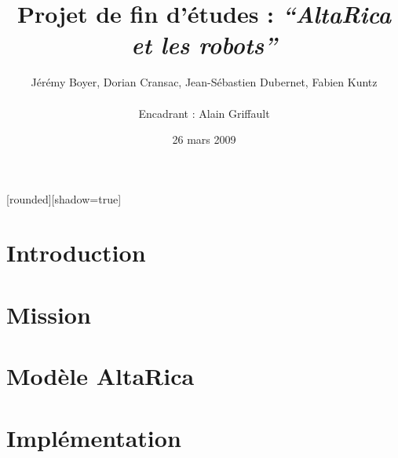 \documentclass[8pt]{beamer}
\begin{document}

[rounded][shadow=true]

\author[J. Boyer, D. Cransac, J-S. Dubernet, F. Kuntz - Encadrant :
A. Griffault]{Jérémy Boyer, Dorian Cransac, Jean-Sébastien Dubernet,
Fabien Kuntz\\
~\\
\small Encadrant : Alain Griffault}
\title{Projet de fin d'études : \textit{``AltaRica et les robots''}} 
\date{\footnotesize 26 mars 2009}

\setcounter{page}{1}

\frame{\titlepage}
\frame{\tableofcontents}

 \section{Introduction}
 \frame{\tableofcontents[current]}
 

 \section{Mission}
 \frame{\tableofcontents[current]}

%  
%  

 \section{Modèle AltaRica}
 \frame{\tableofcontents[current]}

%  
%  
  
 \section{Implémentation}
 \frame{\tableofcontents[current]}
\end{document}

